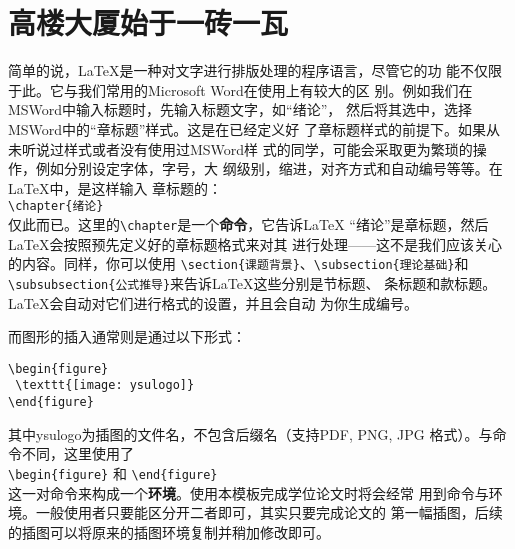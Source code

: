 \section{高楼大厦始于一砖一瓦}\label{section1-1}
简单的说，\LaTeX 是一种对文字进行排版处理的程序语言，尽管它的功
能不仅限于此。它与我们常用的Microsoft Word在使用上有较大的区
别。例如我们在MSWord中输入标题时，先输入标题文字，如“绪论”，
然后将其选中，选择MSWord中的“章标题”样式。这是在已经定义好
了章标题样式的前提下。如果从未听说过样式或者没有使用过MSWord样
式的同学，可能会采取更为繁琐的操作，例如分别设定字体，字号，大
纲级别，缩进，对齐方式和自动编号等等。在\LaTeX 中，是这样输入
章标题的：\\[2pt]
\hspace*{5cm}\verb|\chapter{绪论}|\\[2pt]
仅此而已。这里的\verb|\chapter|是一个\textbf{命令}，它告诉\LaTeX
“绪论”是章标题，然后\LaTeX 会按照预先定义好的章标题格式来对其
进行处理——这不是我们应该关心的内容。同样，你可以使用
\verb|\section{课题背景}|、\verb|\subsection{理论基础}|和
\verb|\subsubsection{公式推导}|来告诉\LaTeX 这些分别是节标题、
条标题和款标题。\LaTeX 会自动对它们进行格式的设置，并且会自动
为你生成编号。

而图形的插入通常则是通过以下形式：
\begin{verbatim}
\begin{figure}
 \texttt{[image: ysulogo]}
\end{figure}
\end{verbatim}
其中ysulogo为插图的文件名，不包含后缀名（\XeLaTeX 支持PDF, PNG, JPG 格式）。与命令不同，这里使用了\\
\verb|\begin{figure}|
和
\verb|\end{figure}|\\
这一对命令来构成一个\textbf{环境}。使用本模板完成学位论文时将会经常
用到命令与环境。一般使用者只要能区分开二者即可，其实只要完成论文的
第一幅插图，后续的插图可以将原来的插图环境复制并稍加修改即可。

